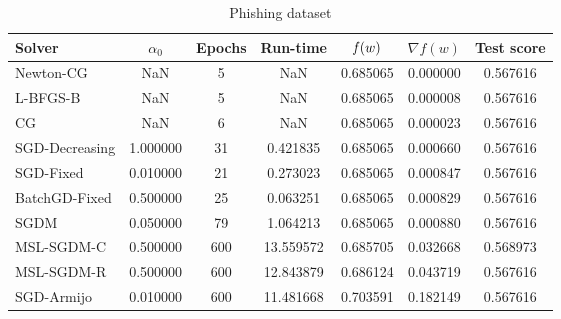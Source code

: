 \begin{table}
\caption{Phishing dataset}
\label{tab:phish-tab}
\centering
\begin{tabular}{lS[round-precision=3]S[drop-zero-decimal]S[round-precision=4]S[round-precision=6]S[exponent-mode=scientific]S[round-precision=6]}
\toprule
Solver & {$\alpha_0$} & {Epochs} & {Run-time} & {$\operatorname*{\mathit{f}}(w)$} & {$\nabla f(w)$} & {Test score} \\
\midrule
Newton-CG & NaN & 5 & NaN & 0.685065 & 0.000000 & 0.567616 \\
L-BFGS-B & NaN & 5 & NaN & 0.685065 & 0.000008 & 0.567616 \\
CG & NaN & 6 & NaN & 0.685065 & 0.000023 & 0.567616 \\
SGD-Decreasing & 1.000000 & 31 & 0.421835 & 0.685065 & 0.000660 & 0.567616 \\
SGD-Fixed & 0.010000 & 21 & 0.273023 & 0.685065 & 0.000847 & 0.567616 \\
BatchGD-Fixed & 0.500000 & 25 & 0.063251 & 0.685065 & 0.000829 & 0.567616 \\
SGDM & 0.050000 & 79 & 1.064213 & 0.685065 & 0.000880 & 0.567616 \\
MSL-SGDM-C & 0.500000 & 600 & 13.559572 & 0.685705 & 0.032668 & 0.568973 \\
MSL-SGDM-R & 0.500000 & 600 & 12.843879 & 0.686124 & 0.043719 & 0.567616 \\
SGD-Armijo & 0.010000 & 600 & 11.481668 & 0.703591 & 0.182149 & 0.567616 \\
\bottomrule
\end{tabular}
\end{table}

